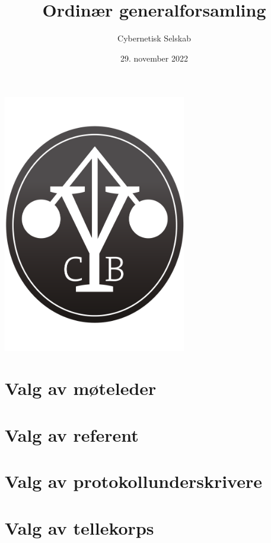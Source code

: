 \documentclass[10pt,norsk,a4paper,usenames,dvipsnames]{article}
\title{\huge Ordinær generalforsamling}
\author{\LARGE Cybernetisk Selskab}
\date{29. november 2022}
\begin{document}
\maketitle



\begin{center}


\includegraphics[width=0.6\textwidth,height=0.6\textheight,keepaspectratio=true]{cyblogoa3.pdf}

\end{center}


\newpage


\tableofcontents

\section{Valg av møteleder}


\section{Valg av referent}


\section{Valg av protokollunderskrivere}


\section{Valg av tellekorps}
\end{document}
